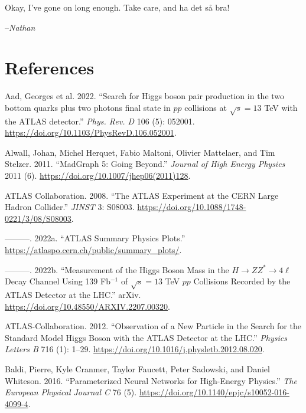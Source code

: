 \documentclass[
  11pt,
  numbers=noendperiod]{book}
\newlength{\cslhangindent}
\newlength{\cslentryspacingunit} %
\newenvironment{CSLReferences}[2] %
 {%
  \setlength{\parindent}{0pt}
  \ifodd #1
  \let\oldpar\par
  \def\par{\hangindent=\cslhangindent\oldpar}
  \fi
  \setlength{\parskip}{#2\cslentryspacingunit}
 }%
 {}
\begin{document}
Okay, I've gone on long enough. Take care, and ha det så bra!

\hfill--\textit{Nathan}


\hypertarget{references}{%
\chapter*{References}\label{references}}

\hypertarget{refs}{}
\begin{CSLReferences}{1}{0}
\leavevmode{}%
Aad, Georges et al. 2022. {``{Search for Higgs boson pair production in
the two bottom quarks plus two photons final state in \(pp\) collisions
at \(\sqrt{s}=13\) TeV with the ATLAS detector}.''} \emph{Phys. Rev. D}
106 (5): 052001. \url{https://doi.org/10.1103/PhysRevD.106.052001}.

\leavevmode{}%
Alwall, Johan, Michel Herquet, Fabio Maltoni, Olivier Mattelaer, and Tim
Stelzer. 2011. {``{MadGraph} 5: Going Beyond.''} \emph{Journal of High
Energy Physics} 2011 (6). \url{https://doi.org/10.1007/jhep06(2011)128}.

\leavevmode{}%
ATLAS Collaboration. 2008. {``{The ATLAS Experiment at the CERN Large
Hadron Collider}.''} \emph{JINST} 3: S08003.
\url{https://doi.org/10.1088/1748-0221/3/08/S08003}.

\leavevmode{}%
---------. 2022a. {``ATLAS Summary Physics Plots.''}
\url{https://atlaspo.cern.ch/public/summary_plots/}.

\leavevmode{}%
---------. 2022b. {``Measurement of the Higgs Boson Mass in the
\(H \rightarrow ZZ^* \rightarrow 4\ell\) Decay Channel Using 139
Fb\(^{-1}\) of \(\sqrt{s}=13\) TeV \(pp\) Collisions Recorded by the
ATLAS Detector at the LHC.''} arXiv.
\url{https://doi.org/10.48550/ARXIV.2207.00320}.

\leavevmode{}%
ATLAS-Collaboration. 2012. {``Observation of a New Particle in the
Search for the Standard Model Higgs Boson with the ATLAS Detector at the
LHC.''} \emph{Physics Letters B} 716 (1): 1--29.
\url{https://doi.org/10.1016/j.physletb.2012.08.020}.

\leavevmode{}%
Baldi, Pierre, Kyle Cranmer, Taylor Faucett, Peter Sadowski, and Daniel
Whiteson. 2016. {``Parameterized Neural Networks for High-Energy
Physics.''} \emph{The European Physical Journal C} 76 (5).
\url{https://doi.org/10.1140/epjc/s10052-016-4099-4}.


\end{CSLReferences}
\end{document}
